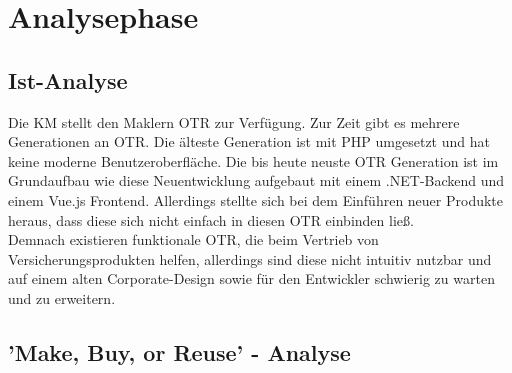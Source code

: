 \newpage
\section{Analysephase}
\label{analysephase}

\subsection{Ist-Analyse}
\label{ist}
\begin{comment}
evtl alte otrs mit nutzwertanalyse vergleichen?
\end{comment}
Die \ac{KM} stellt den Maklern \ac{OTR} zur Verfügung. Zur Zeit gibt es mehrere Generationen an \ac{OTR}. Die älteste Generation ist mit PHP umgesetzt und hat keine moderne Benutzeroberfläche. Die bis heute neuste \ac{OTR} Generation ist im Grundaufbau wie diese Neuentwicklung aufgebaut mit einem .NET-Backend und einem Vue.js Frontend. Allerdings stellte sich bei dem Einführen neuer Produkte heraus, dass diese sich nicht einfach in diesen \ac{OTR} einbinden ließ. \\
Demnach existieren funktionale \ac{OTR}, die beim Vertrieb von Versicherungsprodukten helfen, allerdings sind diese nicht intuitiv nutzbar und auf einem alten Corporate-Design sowie für den Entwickler schwierig zu warten und zu erweitern.

\subsection{'Make, Buy, or Reuse' - Analyse}
\label{makeOrBuy}


